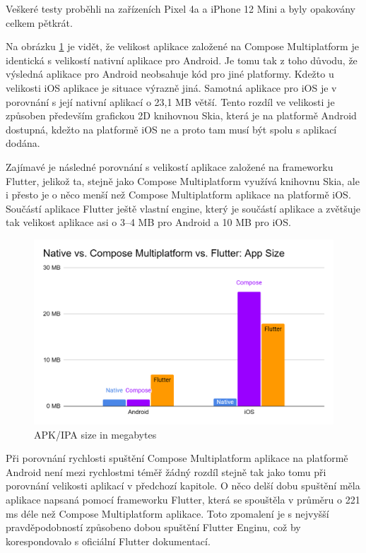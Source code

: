 Veškeré testy proběhli na zařízeních Pixel 4a a iPhone 12 Mini a byly opakovány celkem pětkrát.





Na obrázku \ref{fig:chart_app_sizes} je vidět, že velikost aplikace založené na Compose Multiplatform je identická
s velikostí nativní aplikace pro Android. Je tomu tak z toho důvodu, že výsledná aplikace pro Android neobsahuje kód 
pro jiné platformy. \cite{} Kdežto u velikosti iOS aplikace je situace výrazně jiná. Samotná aplikace pro iOS je v porovnání
s její nativní aplikací o 23,1 MB větší. Tento rozdíl ve velikosti je způsoben především grafickou 2D knihovnou Skia,
která je na platformě Android dostupná, kdežto na platformě iOS ne a proto tam musí být spolu s aplikací dodána. \cite{}

Zajímavé je následné porovnání s velikostí aplikace založené na frameworku Flutter, jelikož ta, stejně jako Compose
Multiplatform využívá knihovnu Skia, ale i přesto je o něco menší než Compose Multiplatform aplikace na platformě iOS.
Součástí aplikace Flutter ještě vlastní engine, který je součástí aplikace a zvětšuje tak velikost aplikace asi o 3–4 MB pro Android a 10 MB 
pro iOS. \cite{flutterSize}

\begin{figure}[H]
  \centering
  \includegraphics[width=.7\textwidth]{chart_app_sizes.png}
  \caption{APK/IPA size in megabytes}
  \label{fig:chart_app_sizes}
\end{figure}


Při porovnání rychlosti spuštění Compose Multiplatform aplikace na platformě Android není mezi rychlostmi téměř žádný
rozdíl stejně tak jako tomu při porovnání velikosti aplikací v předchozí kapitole. O něco delší dobu spuštění měla
aplikace napsaná pomocí frameworku Flutter, která se spouštěla v průměru o 221 ms déle než Compose Multiplatform aplikace. 
Toto zpomalení je s nejvyšší pravděpodobností způsobeno dobou spuštění Flutter Enginu, což by korespondovalo s oficiální
Flutter dokumentací. \cite{flutterPerformance}

